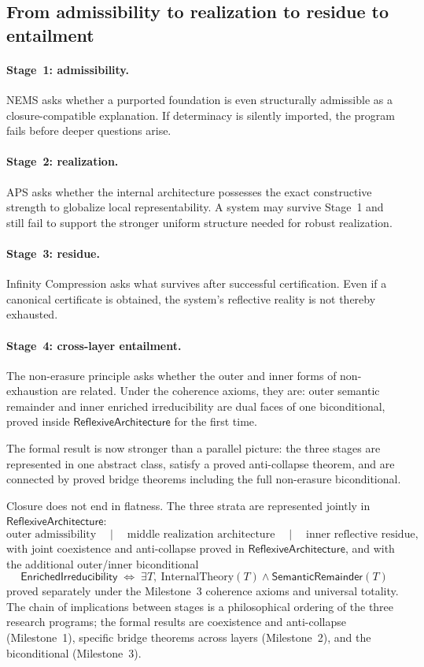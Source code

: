 \documentclass[11pt]{article}
\newcommand{\SemRem}{\ensuremath{\mathsf{SemanticRemainder}}}
\newcommand{\RAL}{\ensuremath{\mathsf{ReflexiveArchitecture}}}
\newcommand{\EnrIrr}{\ensuremath{\mathsf{EnrichedIrreducibility}}}
\begin{document}
\subsection{From admissibility to realization to residue to entailment}

\paragraph{Stage~1: admissibility.}
NEMS asks whether a purported foundation is even structurally admissible as a
closure-compatible explanation.  If determinacy is silently imported, the program fails
before deeper questions arise.

\paragraph{Stage~2: realization.}
APS asks whether the internal architecture possesses the exact constructive strength to
globalize local representability.  A system may survive Stage~1 and still fail to
support the stronger uniform structure needed for robust realization.

\paragraph{Stage~3: residue.}
Infinity Compression asks what survives after successful certification.  Even if a
canonical certificate is obtained, the system's reflective reality is not thereby
exhausted.

\paragraph{Stage~4: cross-layer entailment.}
The non-erasure principle asks whether the outer and inner forms of non-exhaustion are
related.  Under the coherence axioms, they are: outer semantic remainder and inner
enriched irreducibility are dual faces of one biconditional, proved inside $\RAL$
for the first time.

The formal result is now stronger than a parallel picture: the three stages are
represented in one abstract class, satisfy a proved anti-collapse theorem, and are
connected by proved bridge theorems including the full non-erasure biconditional.

Closure does not end in flatness.  The three strata are represented jointly in $\RAL$:
\[
\text{outer admissibility}
\quad\mid\quad
\text{middle realization architecture}
\quad\mid\quad
\text{inner reflective residue},
\]
with joint coexistence and anti-collapse proved in $\RAL$, and with the additional
outer/inner biconditional
\[
\EnrIrr \;\Longleftrightarrow\; \exists T,\ \mathrm{InternalTheory}(T)\wedge\SemRem(T)
\]
proved separately under the Milestone~3 coherence axioms and universal totality.  The
chain of implications between stages is a philosophical ordering of the three research
programs; the formal results are coexistence and anti-collapse (Milestone~1), specific
bridge theorems across layers (Milestone~2), and the biconditional (Milestone~3).
\end{document}

